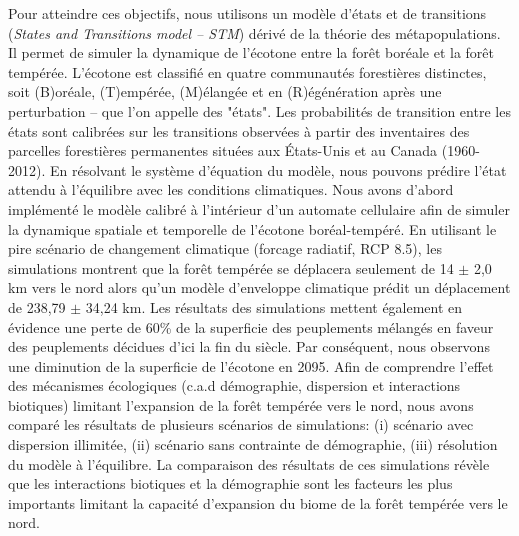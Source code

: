 Pour atteindre ces objectifs, nous utilisons un modèle d'états et de transitions (\textit{States and
Transitions model -- STM}) dérivé de la théorie des métapopulations. Il permet de simuler la
dynamique de l'écotone entre la forêt boréale et la forêt tempérée. L'écotone est classifié en
quatre communautés forestières distinctes, soit (B)oréale, (T)empérée, (M)élangée et en
(R)égénération après une perturbation -- que l'on appelle des "états". Les probabilités de
transition entre les états sont calibrées sur les transitions observées à partir des inventaires des
parcelles forestières permanentes situées aux États-Unis et au Canada (1960-2012). En résolvant le
système d'équation du modèle, nous pouvons prédire l'état attendu à l'équilibre avec les conditions
climatiques. Nous avons d'abord implémenté le modèle calibré à l'intérieur d'un automate cellulaire
afin de simuler la dynamique spatiale et temporelle de l'écotone boréal-tempéré. En utilisant le
pire scénario de changement climatique (forcage radiatif, RCP 8.5), les simulations montrent que la
forêt tempérée se déplacera seulement de 14 $\pm$ 2,0 km vers le nord alors qu'un modèle d'enveloppe
climatique prédit un déplacement de 238,79 $\pm$ 34,24 km. Les résultats des simulations mettent
également en évidence une perte de 60\% de la superficie des peuplements mélangés en faveur des
peuplements décidues d’ici la fin du siècle. Par conséquent, nous observons une diminution de la
superficie de l'écotone en 2095. Afin de comprendre l'effet des mécanismes écologiques (c.a.d
démographie, dispersion et interactions biotiques) limitant l'expansion de la forêt tempérée vers le
nord, nous avons comparé les résultats de plusieurs scénarios de simulations: (i) scénario avec
dispersion illimitée, (ii) scénario sans contrainte de démographie, (iii) résolution du modèle à
l'équilibre. La comparaison des résultats de ces simulations révèle que les interactions biotiques
et la démographie sont les facteurs les plus importants limitant la capacité d'expansion du biome de
la forêt tempérée vers le nord.
